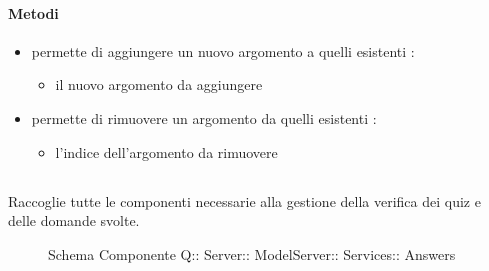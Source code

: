 \paragraph{Metodi}
\begin{itemize}
\item {}
\newline
permette di aggiungere un nuovo argomento a quelli esistenti
\newline
{} :
\begin{itemize}
\item {}
\newline
il nuovo argomento da aggiungere
\end{itemize}
\item {}
\newline
permette di rimuovere un argomento da quelli esistenti
\newline
{} :
\begin{itemize}
\item {}
\newline
l'indice dell'argomento da rimuovere
\end{itemize}
\end{itemize}
\subsection{}
Raccoglie tutte le componenti necessarie alla gestione della verifica dei quiz e delle domande svolte.
\begin{figure}[H]
\centering
\noindent{}
\caption[Schema Componente Quizzipedia::Server::ModelServer::Services::Answers]{Schema Componente Q:: Server:: ModelServer:: Services:: Answers}
\end{figure}
